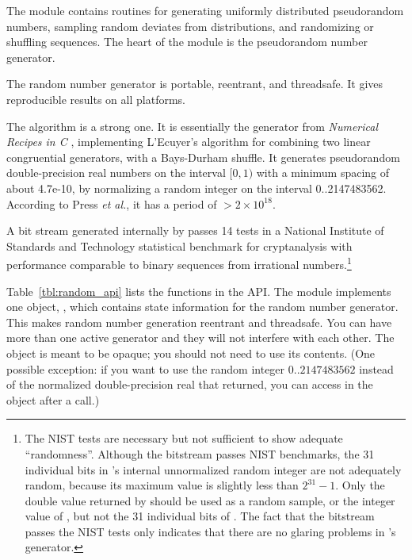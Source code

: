 The  module contains routines for generating uniformly
distributed pseudorandom numbers, sampling random deviates from
distributions, and randomizing or shuffling sequences.  The heart of
the module is the  pseudorandom number generator.

The  random number generator is portable,
reentrant, and threadsafe. It gives reproducible results on all
platforms.

The  algorithm is a strong one. It is essentially
the  generator from \emph{Numerical Recipes in C}
\citep{Press93}, implementing L'Ecuyer's algorithm for combining two
linear congruential generators, with a Bays-Durham shuffle. It
generates pseudorandom double-precision real numbers on the interval
$[0,1)$ with a minimum spacing of about 4.7e-10, by normalizing a
random integer on the interval 0..2147483562.  According to Press
\emph{et al.}, it has a period of $> 2 \times 10^{18}$.

A bit stream generated internally by  passes 14
tests in a National Institute of Standards and Technology statistical
benchmark for cryptanalysis \citep{Rukhin01} with performance
comparable to binary sequences from irrational numbers.\footnote{The
NIST tests are necessary but not sufficient to show adequate
``randomness''. Although the bitstream passes NIST benchmarks, the 31
individual bits in 's internal unnormalized
random integer are not adequately random, because its maximum value is
slightly less than $2^{31}-1$. Only the double value returned by
 should be used as a random sample, or the
integer value of , but not the 31 individual bits of
.  The fact that the bitstream passes the NIST tests
only indicates that there are no glaring problems in
's generator.}

Table~\ref{tbl:random_api} lists the functions in the 
API. The module implements one object, , which
contains state information for the random number generator.  This
makes random number generation reentrant and threadsafe. You can have
more than one active generator and they will not interfere with each
other. The object is meant to be opaque; you should not need to use
its contents.  (One possible exception: if you want to use the random
integer $0..2147483562$ instead of the normalized double-precision
real that  returned, you can access
 in the  object  after a
 call.)

